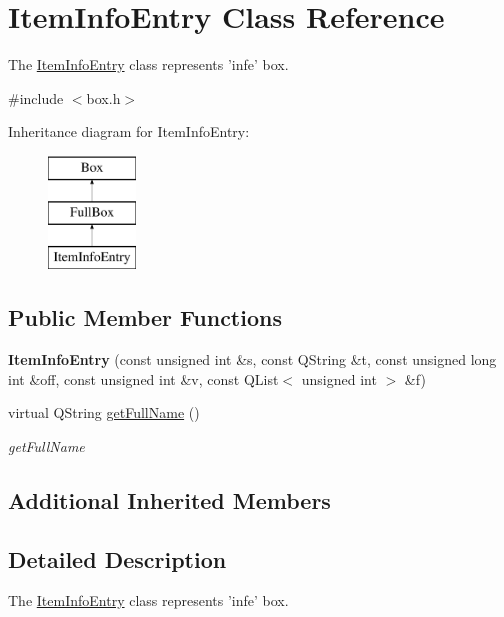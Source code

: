 \hypertarget{class_item_info_entry}{\section{Item\-Info\-Entry Class Reference}
\label{class_item_info_entry}
}


The \hyperlink{class_item_info_entry}{Item\-Info\-Entry} class represents 'infe' box.  




{\ttfamily \#include $<$box.\-h$>$}

Inheritance diagram for Item\-Info\-Entry\-:\begin{figure}[H]
\begin{center}
\leavevmode
\includegraphics[height=3.000000cm]{class_item_info_entry}
\end{center}
\end{figure}
\subsection*{Public Member Functions}
\begin{DoxyCompactItemize}
\item 
\hypertarget{class_item_info_entry_a0f977408181457a930b5a32d662ce183}{{\bfseries Item\-Info\-Entry} (const unsigned int \&s, const Q\-String \&t, const unsigned long int \&off, const unsigned int \&v, const Q\-List$<$ unsigned int $>$ \&f)}\label{class_item_info_entry_a0f977408181457a930b5a32d662ce183}

\item 
virtual Q\-String \hyperlink{class_item_info_entry_a7d744fa6aeb0ee948a898bb7b629a384}{get\-Full\-Name} ()
\begin{DoxyCompactList}\small\item\em get\-Full\-Name \end{DoxyCompactList}\end{DoxyCompactItemize}
\subsection*{Additional Inherited Members}


\subsection{Detailed Description}
The \hyperlink{class_item_info_entry}{Item\-Info\-Entry} class represents 'infe' box. 

